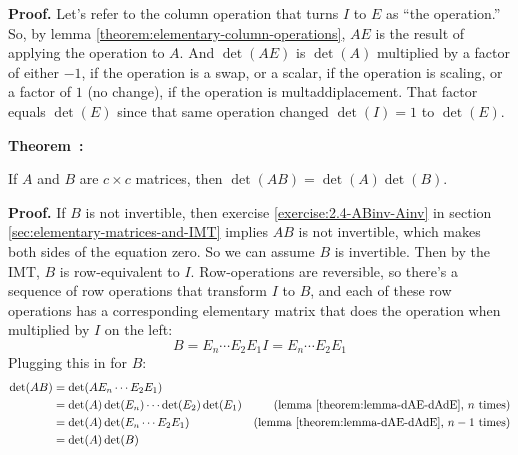 \documentclass[11pt, letterpaper]{report}
\newenvironment{notes}{}{}
\newenvironment{book}{}{}
\newcounter{exercise}[section]
\newcounter{theorem}[chapter]
\newenvironment{theorem}[1][]{\refstepcounter{theorem}\begin{bbox}\par
    \noindent\textbf{Theorem~\thetheorem: #1}}{\end{bbox}}
\newlength\oldfboxsep%
\newlength\myminiwidth%
\newenvironment{bbox}{%
  \setlength\oldfboxsep\fboxsep
  \setlength{\fboxsep}{.1in}%
  \setlength\myminiwidth\linewidth%
  \addtolength\myminiwidth{-0.2in}%
  \vspace{0.1in}%
  \begin{lrbox}{\bboxbox}\begin{minipage}{\myminiwidth}%
    }{%
    \end{minipage}\end{lrbox}%
  \noindent\fbox{\usebox{\bboxbox}}\vspace{0.1in}\setlength\fboxsep\oldfboxsep%
}
\begin{document}
\begin{notes}
\vfill 
\end{notes}

\begin{book}
\textbf{Proof.} Let's refer to the column operation that turns $I$ to $E$ as ``the operation.'' So, by lemma \ref{theorem:elementary-column-operations}, $AE$ is the result of applying the operation to $A$. And $\det(AE)$ is $\det(A)$ multiplied by a factor of either $-1$, if the operation is a swap, or a scalar, if the operation is scaling, or a factor of $1$ (no change), if the operation is multaddiplacement. That factor equals $\det(E)$ since that same operation changed $\det(I)=1$ to $\det(E)$. \blacksquare
\end{book}

\begin{theorem}
\label{theorem:detAB-detAdetB} 

If $A$ and $B$ are $c\times c$ matrices, then $\det(AB) = \det(A)\det(B)$.
\end{theorem}

\begin{notes}
\vfill
\newpage
\end{notes}

\begin{book}
\textbf{Proof.} If $B$ is not invertible, then exercise \ref{exercise:2.4-ABinv-Ainv} in section \ref{sec:elementary-matrices-and-IMT} implies $AB$ is not invertible, which makes both sides of the equation zero. So we can assume $B$ is invertible. Then by the IMT, $B$ is row-equivalent to $I$. Row-operations are reversible, so there's a sequence of row operations that transform $I$ to $B$, and each of these row operations has a corresponding elementary matrix that does the operation when multiplied by $I$ on the left:
\[ B =E_n\cdots E_2E_1I = E_n\cdots E_2E_1 \]
Plugging this in for $B$:%
\begin{align*}
 \det(AB) &= \det(AE_n\cdots E_2E_1) \\
&= \det(A)\det(E_n)\cdots\det(E_2)\det(E_1) & (\text{lemma \ref{theorem:lemma-dAE-dAdE}, }n\text{ times}) \\
&= \det(A)\det(E_n \cdots E_2E_1) & (\text{lemma \ref{theorem:lemma-dAE-dAdE}, }n-1\text{ times}) \\
&= \det(A)\det(B)
\end{align*}
\blacksquare
\end{book}
\end{document}
